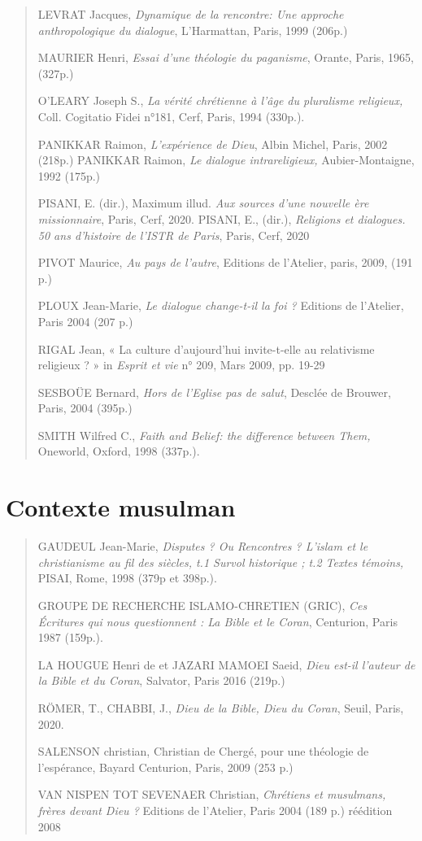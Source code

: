 \begin{quote}
LEVRAT Jacques, \emph{Dynamique de la rencontre: Une approche
anthropologique du dialogue}, L'Harmattan, Paris, 1999 (206p.)

MAURIER Henri, \emph{Essai d'une théologie du paganisme}, Orante, Paris,
1965, (327p.)

O'LEARY Joseph S., \emph{La vérité chrétienne à l'âge du pluralisme
religieux,} Coll. Cogitatio Fidei n°181, Cerf, Paris, 1994 (330p.).

PANIKKAR Raimon, \emph{L'expérience de Dieu}, Albin Michel, Paris, 2002
(218p.) PANIKKAR Raimon, \emph{Le dialogue intrareligieux,}
Aubier-Montaigne, 1992 (175p.)

PISANI, E. (dir.), Maximum illud. \emph{Aux sources d'une nouvelle ère
missionnaire}, Paris, Cerf, 2020. PISANI, E., (dir.), \emph{Religions et
dialogues. 50 ans d'histoire de l'ISTR de Paris}, Paris, Cerf, 2020

PIVOT Maurice, \emph{Au pays de l'autre}, Editions de l'Atelier, paris,
2009, (191 p.)

PLOUX Jean-Marie, \emph{Le dialogue change-t-il la foi ?} Editions de
l'Atelier, Paris 2004 (207 p.)

RIGAL Jean, « La culture d'aujourd'hui invite-t-elle au relativisme
religieux ? » in \emph{Esprit et vie} n° 209, Mars 2009, pp. 19-29

SESBOÜE Bernard, \emph{Hors de l'Eglise pas de salut}, Desclée de
Brouwer, Paris, 2004 (395p.)

SMITH Wilfred C., \emph{Faith and Belief: the difference between Them,}
Oneworld, Oxford, 1998 (337p.).
\end{quote}

\hypertarget{contexte-musulman}{%
\section{Contexte musulman}\label{contexte-musulman}}

\begin{quote}
GAUDEUL Jean-Marie, \emph{Disputes ? Ou Rencontres ? L'islam et le
christianisme au fil des siècles, t.1 Survol historique ; t.2 Textes
témoins,} PISAI, Rome, 1998 (379p et 398p.).

GROUPE DE RECHERCHE ISLAMO-CHRETIEN (GRIC), \emph{Ces Écritures qui nous
questionnent : La Bible et le Coran}, Centurion, Paris 1987 (159p.).

LA HOUGUE Henri de et JAZARI MAMOEI Saeid, \emph{Dieu est-il l'auteur de
la Bible et du Coran}, Salvator, Paris 2016 (219p.)

RÖMER, T., CHABBI, J., \emph{Dieu de la Bible, Dieu du Coran}, Seuil,
Paris, 2020.

SALENSON christian, Christian de Chergé, pour une théologie de
l'espérance, Bayard Centurion, Paris, 2009 (253 p.)

VAN NISPEN TOT SEVENAER Christian, \emph{Chrétiens et musulmans, frères
devant Dieu ?} Editions de l'Atelier, Paris 2004 (189 p.) réédition 2008
\end{quote}

